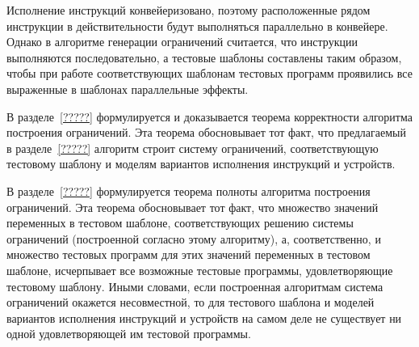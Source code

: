 Исполнение инструкций конвейеризовано, поэтому расположенные рядом инструкции в действительности будут выполняться параллельно в конвейере. Однако в алгоритме генерации ограничений считается, что инструкции выполняются последовательно, а тестовые шаблоны составлены таким образом, чтобы при работе соответствующих шаблонам тестовых программ проявились все выраженные в шаблонах параллельные эффекты.

В разделе~\ref{?????} формулируется и доказывается теорема корректности алгоритма построения ограничений. Эта теорема обосновывает тот факт, что предлагаемый в разделе~\ref{?????} алгоритм строит систему ограничений, соответствующую тестовому шаблону и моделям вариантов исполнения инструкций и устройств.

В разделе~\ref{?????} формулируется теорема полноты алгоритма построения ограничений. Эта теорема обосновывает тот факт, что множество значений переменных в тестовом шаблоне, соответствующих решению системы ограничений (построенной согласно этому алгоритму), а, соответственно, и множество тестовых программ для этих значений переменных в тестовом шаблоне, исчерпывает все возможные тестовые программы, удовлетворяющие тестовому шаблону. Иными словами, если построенная алгоритмам система ограничений окажется несовместной, то для тестового шаблона и моделей вариантов исполнения инструкций и устройств на самом деле не существует ни одной удовлетворяющей им тестовой программы.

